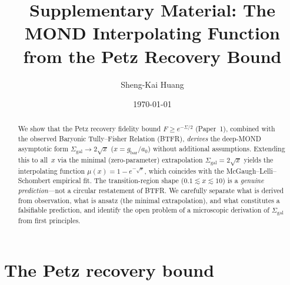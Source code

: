 \documentclass[prd,twocolumn,superscriptaddress,longbibliography,floatfix]{revtex4-2}
\begin{document}
\title{Supplementary Material: The MOND Interpolating Function\\
from the Petz Recovery Bound}

\author{Sheng-Kai Huang}

\date{\today}

\begin{abstract}
We show that the Petz recovery fidelity bound
$F \geq e^{-\Sigma/2}$ (Paper~1), combined with the observed
Baryonic Tully--Fisher Relation (BTFR), \emph{derives} the
deep-MOND asymptotic form $\Sigma_{\mathrm{gal}} \to 2\sqrt{x}$
($x = g_{\mathrm{bar}}/a_0$) without additional assumptions.
Extending this to all~$x$ via the minimal (zero-parameter)
extrapolation $\Sigma_{\mathrm{gal}} = 2\sqrt{x}$ yields the
interpolating function $\mu(x) = 1 - e^{-\sqrt{x}}$, which
coincides with the McGaugh--Lelli--Schombert empirical fit.
The transition-region shape ($0.1 \lesssim x \lesssim 10$) is a
\emph{genuine prediction}---not a circular restatement of BTFR.
We carefully separate what is derived from observation, what is
ansatz (the minimal extrapolation), and what constitutes a
falsifiable prediction, and identify the open problem of a
microscopic derivation of $\Sigma_{\mathrm{gal}}$ from first
principles.
\end{abstract}

\maketitle

\section{The Petz recovery bound}
\label{sec:petz}
\end{document}
